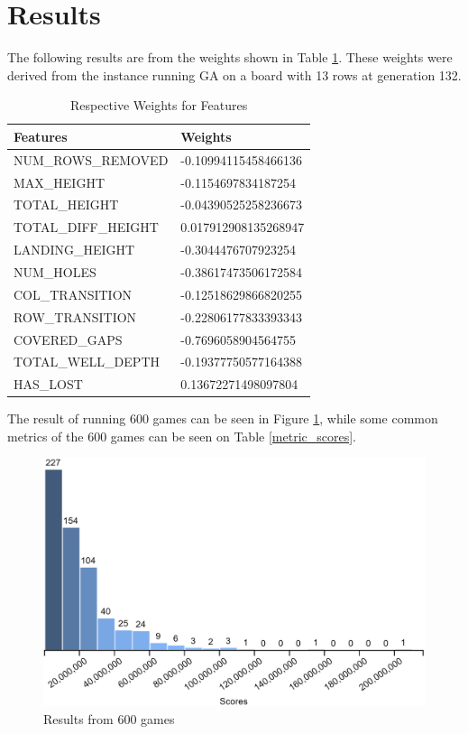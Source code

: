 \documentclass[a4paper,12pt,twocolumn]{article}
\begin{document}
\section{Results}
The following results are from the weights shown in Table \ref{feature_weights}.
These weights were derived from the instance running GA on a board with 13 rows
at generation 132.

\begin{table}[h]
    \begin{tabular}{|l|l|}
        \hline
        \textbf{Features}   & \textbf{Weights}     \\
        \hline
        NUM\_ROWS\_REMOVED  & -0.10994115458466136 \\
        \hline
        MAX\_HEIGHT         & -0.1154697834187254  \\
        \hline
        TOTAL\_HEIGHT       & -0.04390525258236673 \\
        \hline
        TOTAL\_DIFF\_HEIGHT & 0.017912908135268947 \\
        \hline
        LANDING\_HEIGHT     & -0.3044476707923254  \\
        \hline
        NUM\_HOLES          & -0.38617473506172584 \\
        \hline
        COL\_TRANSITION     & -0.12518629866820255 \\
        \hline
        ROW\_TRANSITION     & -0.22806177833393343 \\
        \hline
        COVERED\_GAPS       & -0.7696058904564755  \\
        \hline
        TOTAL\_WELL\_DEPTH  & -0.19377750577164388 \\
        \hline
        HAS\_LOST           & 0.13672271498097804  \\
        \hline
    \end{tabular}
    \caption{Respective Weights for Features}
    \label{feature_weights}
\end{table}

The result of running 600 games can be seen in Figure \ref{score_histogram},
while some common metrics of the 600 games can be seen on Table \ref{metric_scores}.

\begin{figure}[h]
    \centering
    \includegraphics[scale=0.15]{games_600_histogram.png}
    \caption{Results from 600 games}
    \label{score_histogram}
\end{figure}
\end{document}
